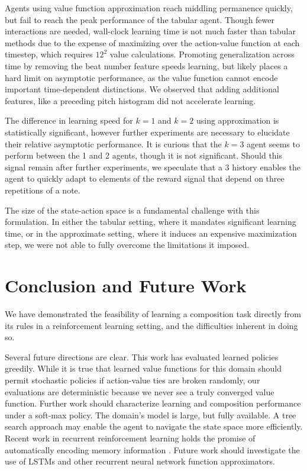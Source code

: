 \documentclass{article}
\begin{document}
    Agents using value function approximation reach middling permanence quickly, but fail to reach the peak performance of the tabular agent. Though fewer interactions are needed, wall-clock learning time is not much faster than tabular methods due to the expense of maximizing over the action-value function at each timestep, which requires $12^2$ value calculations. Promoting generalization across time by removing the beat number feature speeds learning, but likely places a hard limit on asymptotic performance, as the value function cannot encode important time-dependent distinctions. We observed that adding additional features, like a preceding pitch histogram did not accelerate learning.
    
    The difference in learning speed for $k=1$ and $k=2$ using approximation is statistically significant, however further experiments are necessary to elucidate their relative asymptotic performance. It is curious that the $k=3$ agent seems to perform between the 1 and 2 agents, though it is not significant. Should this signal remain after further experiments, we speculate that a 3 history enables the agent to quickly adapt to elements of the reward signal that depend on three repetitions of a note.
    
    The size of the state-action space is a fundamental challenge with this formulation. In either the tabular setting, where it mandates significant learning time, or in the approximate setting, where it induces an expensive maximization step, we were not able to fully overcome the limitations it imposed.
    


	\section{Conclusion and Future Work}
    
    We have demonstrated the feasibility of learning a composition task directly from its rules in a reinforcement learning setting, and the difficulties inherent in doing so. 
    
    Several future directions are clear. This work has evaluated learned policies greedily. While it is true that learned value functions for this domain should permit stochastic policies if action-value ties are broken randomly, our evaluations are deterministic because we never see a truly converged value function. Further work should characterize learning and composition performance under a soft-max policy. The domain's model is large, but fully available. A tree search approach may enable the agent to navigate the state space more efficiently. Recent work in recurrent reinforcement learning holds the promise of automatically encoding memory information \cite{Hausknecht2015}. Future work should investigate the use of LSTMs and other recurrent neural network function approximators.
\end{document}
